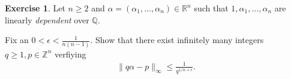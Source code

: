 \documentclass[12pt,a4paper]{article}
\theoremstyle{plain}
\newtheorem*{Sol*}{Solution}
\theoremstyle{definition}
\newtheorem{Ex}{Exercise}
\def \Q {\mathbb Q}
\def \R {\mathbb R}
\def \Z {\mathbb Z}
\newif\ifsolutions
\newcommand{\exercise}[2]{
			\begin{Ex} #1 \end{Ex}
			\ifsolutions  \begin{Sol*} #2 \end{Sol*} \bigskip \else \bigskip  \fi
		}
\begin{document}
\exercise{
	Let $n\geq2$ and $\alpha = (\alpha_1, \dots, \alpha_n) \in \R^n$ such that $1, \alpha_1, \dots, \alpha_n$ are linearly \emph{dependent} over $\Q$.

	Fix an $0 < \epsilon < \frac{1}{n(n-1)}$.
	Show that there exist infinitely many integers $q\geq1, p\in\Z^n$ verfiying
		\begin{gather*}
			 \| q \alpha - p \|_\infty \leq \frac{1}{q^{1/n + \epsilon}}.
		\end{gather*}
}
{}
\end{document}
